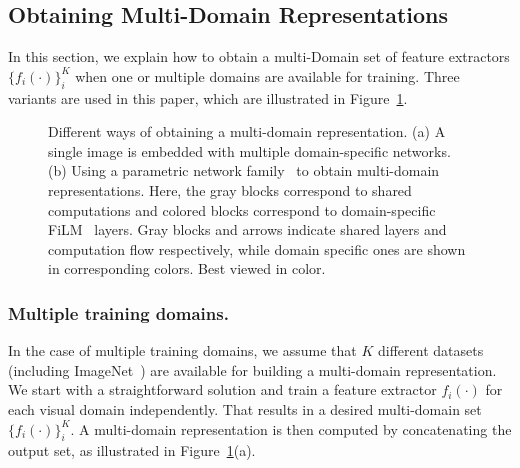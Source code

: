 \documentclass[runningheads]{llncs}
\begin{document}
\subsection{Obtaining Multi-Domain Representations}\label{sec:universal}
In this section, we explain how to obtain a multi-Domain set of feature
extractors $\{f_i(\cdot)\}_i^{K}$ when one or multiple domains are available for
training. Three variants are used in this paper, which are illustrated in Figure~\ref{fig:universal}.
\begin{figure}[t!]
\centering
\caption{Different ways of obtaining a multi-domain representation. (a) A single
  image is embedded with multiple domain-specific networks. (b) Using a parametric
  network family~\cite{rebuffi2018efficient} to obtain multi-domain
  representations. Here, the gray blocks correspond to
  shared computations and colored blocks correspond to domain-specific
  FiLM~\cite{perez2018film} layers.
Gray blocks and arrows
  indicate shared layers and computation flow respectively, while domain specific
  ones are shown in corresponding colors. Best viewed in color.}
\label{fig:universal}
\end{figure}

\subsubsection{Multiple training domains.}\label{subsec:pf}
In the case of multiple training domains, we assume that $K$ different datasets
(including ImageNet~\cite{imagenet})
are available for building a multi-domain representation. We start with a
straightforward solution and train a feature extractor $f_i(\cdot)$
for each visual domain independently. That results in a desired multi-domain set
$\{f_i(\cdot)\}_i^{K}$. A multi-domain representation is then computed by
concatenating the output set, as illustrated in Figure~\ref{fig:universal}(a).
\end{document}
